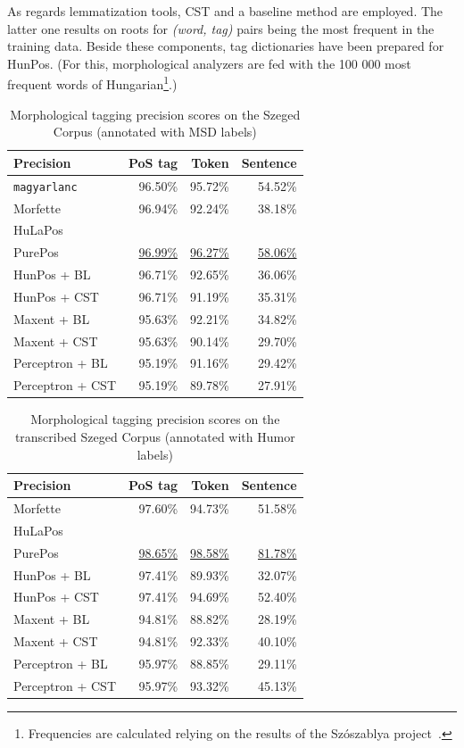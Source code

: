 As regards lemmatization tools, CST and a baseline method are employed. 
The latter one results on roots for \emph{(word, tag)} pairs being the most frequent in the training data. 
Beside these components, tag dictionaries have been prepared for HunPos. 
(For this, morphological analyzers are fed with the 100 000 most frequent words of Hungarian\footnote{Frequencies are calculated relying on the results of the Szószablya project~\cite{Halacsy2004}.}.) %

\begin{table}[H]
 \centering
 \caption{Morphological tagging precision scores on the Szeged Corpus (annotated with MSD labels)}
\begin{tabular}{l r r r}
  \hline
  Precision &  PoS tag &  Token &  Sentence \\
  \hline
  \texttt{magyarlanc} &  96.50\% &  95.72\% &  54.52\% \\
  Morfette &  96.94\% &  92.24\% &  38.18\% \\
  HuLaPos &   &   &   \\
  PurePos &  \underline{96.99\%} &  \underline{96.27\%} &  \underline{58.06\%} \\
  HunPos + BL &  96.71\% &  92.65\% &  36.06\% \\
  HunPos + CST &  96.71\% &  91.19\% &  35.31\% \\
  Maxent + BL &  95.63\% &  92.21\% &  34.82\% \\
  Maxent + CST &  95.63\% &  90.14\% &  29.70\% \\
  Perceptron + BL &  95.19\% &  91.16\% &  29.42\% \\
  Perceptron + CST &  95.19\% &  89.78\% &  27.91\% \\
  \hline
\end{tabular}
\label{tab:morphtag-orig}
\end{table}


\begin{table}[H]
 \centering
 \caption{Morphological tagging precision scores on the transcribed Szeged Corpus (annotated with Humor labels)}
\begin{tabular}{l r r r}
  \hline
  Precision &  PoS tag &  Token &  Sentence \\
  \hline
  Morfette &  97.60\% &  94.73\% &  51.58\% \\
  HuLaPos &   &   &   \\
  PurePos &  \underline{98.65\%} &  \underline{98.58\%} &  \underline{81.78\%} \\
  HunPos + BL &  97.41\% &  89.93\% &  32.07\% \\
  HunPos + CST &  97.41\% &  94.69\% &  52.40\% \\
  Maxent + BL &  94.81\% &  88.82\% &  28.19\% \\
  Maxent + CST &  94.81\% &  92.33\% &  40.10\% \\
  Perceptron + BL &  95.97\% &  88.85\% &  29.11\% \\
  Perceptron + CST &  95.97\% &  93.32\% &  45.13\% \\
  \hline
\end{tabular}
\label{tab:morphtag-humor}
\end{table}


